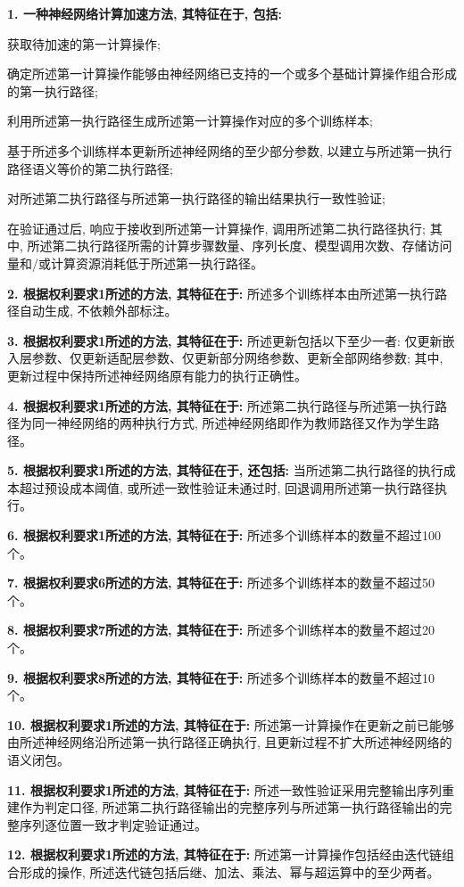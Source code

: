 \documentclass[
]{article}
\begin{document}
\textbf{1. 一种神经网络计算加速方法, 其特征在于, 包括:}

获取待加速的第一计算操作;

确定所述第一计算操作能够由神经网络已支持的一个或多个基础计算操作组合形成的第一执行路径;

利用所述第一执行路径生成所述第一计算操作对应的多个训练样本;

基于所述多个训练样本更新所述神经网络的至少部分参数,
以建立与所述第一执行路径语义等价的第二执行路径;

对所述第二执行路径与所述第一执行路径的输出结果执行一致性验证;

在验证通过后, 响应于接收到所述第一计算操作, 调用所述第二执行路径执行;
其中,
所述第二执行路径所需的计算步骤数量、序列长度、模型调用次数、存储访问量和/或计算资源消耗低于所述第一执行路径。

\textbf{2. 根据权利要求1所述的方法, 其特征在于:}
所述多个训练样本由所述第一执行路径自动生成, 不依赖外部标注。

\textbf{3. 根据权利要求1所述的方法, 其特征在于:}
所述更新包括以下至少一者:
仅更新嵌入层参数、仅更新适配层参数、仅更新部分网络参数、更新全部网络参数;
其中, 更新过程中保持所述神经网络原有能力的执行正确性。

\textbf{4. 根据权利要求1所述的方法, 其特征在于:}
所述第二执行路径与所述第一执行路径为同一神经网络的两种执行方式,
所述神经网络即作为教师路径又作为学生路径。

\textbf{5. 根据权利要求1所述的方法, 其特征在于, 还包括:}
当所述第二执行路径的执行成本超过预设成本阈值, 或所述一致性验证未通过时,
回退调用所述第一执行路径执行。

\textbf{6. 根据权利要求1所述的方法, 其特征在于:}
所述多个训练样本的数量不超过100个。

\textbf{7. 根据权利要求6所述的方法, 其特征在于:}
所述多个训练样本的数量不超过50个。

\textbf{8. 根据权利要求7所述的方法, 其特征在于:}
所述多个训练样本的数量不超过20个。

\textbf{9. 根据权利要求8所述的方法, 其特征在于:}
所述多个训练样本的数量不超过10个。

\textbf{10. 根据权利要求1所述的方法, 其特征在于:}
所述第一计算操作在更新之前已能够由所述神经网络沿所述第一执行路径正确执行,
且更新过程不扩大所述神经网络的语义闭包。

\textbf{11. 根据权利要求1所述的方法, 其特征在于:}
所述一致性验证采用完整输出序列重建作为判定口径,
所述第二执行路径输出的完整序列与所述第一执行路径输出的完整序列逐位置一致才判定验证通过。

\textbf{12. 根据权利要求1所述的方法, 其特征在于:}
所述第一计算操作包括经由迭代链组合形成的操作,
所述迭代链包括后继、加法、乘法、幂与超运算中的至少两者。
\end{document}
